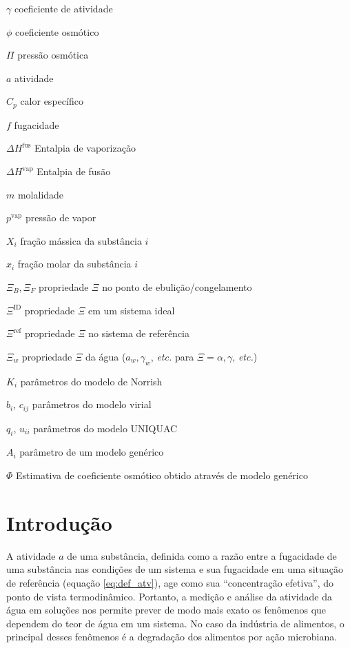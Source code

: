 \documentclass[
	12pt,				%
	openright,
	twoside,
	a4paper,			%
	english,			%
	french,				%
	spanish,			%
	brazil				%
	]{abntex2}
\begin{document}
\begin{simbolos}
	\item[$ \gamma $] coeficiente de atividade
	\item[$ \phi $] coeficiente osmótico
	\item[$ \Pi $] pressão osmótica
	\item[$ a $] atividade
	\item[$ C_p $] calor específico
	\item[$ f $] fugacidade
	\item[$ \Delta H^\text{fus} $] Entalpia de vaporização
	\item[$ \Delta H^\text{vap} $] Entalpia de fusão
	\item[$ m $] molalidade
	\item[$ p^\text{vap} $] pressão de vapor
	\item[$ X_i $] fração mássica da substância $i$
	\item[$ x_i $] fração molar da substância $i$
	\item[$ \Xi_B, \Xi_F $] propriedade $\Xi$ no ponto de ebulição/congelamento
	\item[$ \Xi^\text{ID} $] propriedade $\Xi$ em um sistema ideal
	\item[$ \Xi^\text{ref} $] propriedade $\Xi$ no sistema de referência
	\item[$ \Xi_w $] propriedade $\Xi$ da água ($a_w, \gamma_w$, \textit{etc.} %
		para $\Xi = \alpha, \gamma$, \textit{etc.})
	\item[$K_i$] parâmetros do modelo de Norrish
	\item[$b_i$, $c_{ij}$] parâmetros do modelo virial
	\item[$q_i$, $u_{ii}$] parâmetros do modelo UNIQUAC
	\item[$A_i$] parâmetro de um modelo genérico
	\item[$\Phi$] Estimativa de coeficiente osmótico obtido através de %
		modelo genérico
\end{simbolos}

\tableofcontents*
\cleardoublepage

\textual

\part{Introdução}

A atividade $a$ de uma substância, definida \cite{sandler2017} como
a razão entre a fugacidade de uma substância nas condições de um sistema
e sua fugacidade em uma situação de referência (equação \ref{eq:def_atv}),
age como sua ``concentração efetiva'', do ponto de vista termodinâmico.
Portanto, a medição e análise da atividade da água em soluções nos permite
prever de modo mais exato os fenômenos que dependem do teor de água em
um sistema. No caso da indústria de alimentos, o principal desses fenômenos
é a degradação dos alimentos por ação microbiana.
\end{document}
